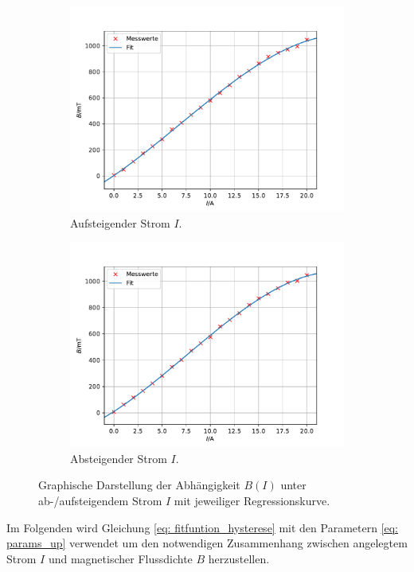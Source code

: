 \begin{figure}
  \centering
  \begin{subfigure}{0.48\textwidth}
    \centering
  \includegraphics[width = \textwidth]{../Messdaten/plots/hysterese_aufsteigend.pdf}
  \caption{Aufsteigender Strom $I$.}
  \label{fig: hysterese_aufsteigend}
\end{subfigure}
\hfill
  \begin{subfigure}{0.48\textwidth}
  \centering
  \includegraphics[width = \textwidth]{../Messdaten/plots/hysterese_absteigend.pdf}
  \caption{Absteigender Strom $I$.}
  \label{fig: hysterese_absteigend}
\end{subfigure}
\caption{Graphische Darstellung der Abhängigkeit $B(I)$ unter ab-/aufsteigendem Strom $I$ mit jeweiliger Regressionskurve.}
\label{fig: hysterese_fit}
\end{figure}
Im Folgenden wird Gleichung \eqref{eq: fitfuntion_hysterese} mit den Parametern \eqref{eq: params_up}
verwendet um den notwendigen Zusammenhang zwischen angelegtem Strom $I$ und magnetischer Flussdichte $B$ herzustellen.

